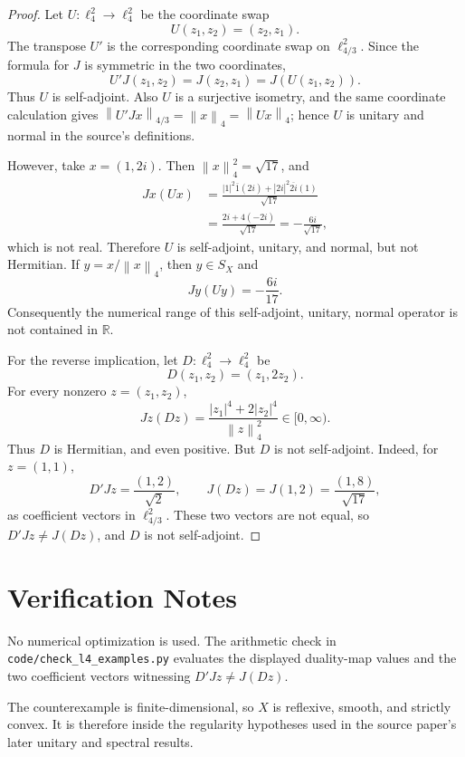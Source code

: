 \documentclass[11pt]{article}
\newcommand{\norm}[1]{\left\lVert #1 \right\rVert}
\begin{document}
\begin{proof}
Let \(U:\ell_4^2\to \ell_4^2\) be the coordinate swap
\[
  U(z_1,z_2)=(z_2,z_1).
\]
The transpose \(U'\) is the corresponding coordinate swap on
\(\ell_{4/3}^2\).  Since the formula for \(J\) is symmetric in the two
coordinates,
\[
  U'J(z_1,z_2)=J(z_2,z_1)=J(U(z_1,z_2)).
\]
Thus \(U\) is self-adjoint.  Also \(U\) is a surjective isometry, and the same
coordinate calculation gives \(\norm{U'Jx}_{4/3}=\norm{x}_4=\norm{Ux}_4\);
hence \(U\) is unitary and normal in the source's definitions.

However, take \(x=(1,2i)\).  Then \(\norm{x}_4^2=\sqrt{17}\), and
\[
\begin{aligned}
  Jx(Ux)
  &=
  \frac{|1|^2\overline{1}(2i)+|2i|^2\overline{2i}(1)}
       {\sqrt{17}}  \\
  &=
  \frac{2i+4(-2i)}{\sqrt{17}}
   =
  -\frac{6i}{\sqrt{17}},
\end{aligned}
\]
which is not real.  Therefore \(U\) is self-adjoint, unitary, and normal, but
not Hermitian.  If \(y=x/\norm{x}_4\), then \(y\in S_X\) and
\[
  Jy(Uy)=-\frac{6i}{17}.
\]
Consequently the numerical range of this self-adjoint, unitary, normal
operator is not contained in \(\mathbb R\).

For the reverse implication, let \(D:\ell_4^2\to\ell_4^2\) be
\[
  D(z_1,z_2)=(z_1,2z_2).
\]
For every nonzero \(z=(z_1,z_2)\),
\[
  Jz(Dz)=
  \frac{|z_1|^4+2|z_2|^4}{\norm{z}_4^2}\in [0,\infty).
\]
Thus \(D\) is Hermitian, and even positive.  But \(D\) is not self-adjoint.
Indeed, for \(z=(1,1)\),
\[
  D'Jz=\frac{(1,2)}{\sqrt 2},
  \qquad
  J(Dz)=J(1,2)=\frac{(1,8)}{\sqrt{17}},
\]
as coefficient vectors in \(\ell_{4/3}^2\).  These two vectors are not equal,
so \(D'Jz\neq J(Dz)\), and \(D\) is not self-adjoint.
\end{proof}

\section*{Verification Notes}

No numerical optimization is used.  The arithmetic check in
\texttt{code/check\_l4\_examples.py} evaluates the displayed duality-map
values and the two coefficient vectors witnessing \(D'Jz\neq J(Dz)\).

The counterexample is finite-dimensional, so \(X\) is reflexive, smooth, and
strictly convex.  It is therefore inside the regularity hypotheses used in the
source paper's later unitary and spectral results.
\end{document}
